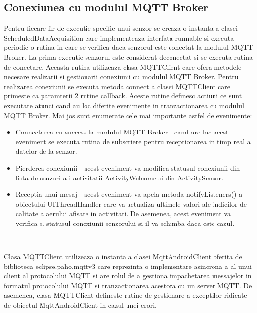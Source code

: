 \subsection{Conexiunea cu modulul MQTT Broker}\label{subsec:pi_appandroid_conectare_mqtt}
Pentru fiecare fir de executie specific unui senzor se creaza o instanta a clasei ScheduledDataAcquisition care implementeaza interfata runnable si executa periodic o rutina 
in care se verifica daca senzorul este conectat la modulul MQTT Broker. La prima executie senzorul este considerat deconectat si se executa rutina de conectare. 
Aceasta rutina utilizeaza clasa MQTTClient care ofera metodele necesare realizarii si gestionarii conexiunii cu modulul MQTT Broker. Pentru realizarea conexiunii se 
executa metoda connect a clasei MQTTClient care primeste ca paramterii 2 rutine callback. Aceste rutine definesc actiuni ce sunt executate atunci cand au loc 
diferite evenimente in tranzactionarea cu modulul MQTT Broker. Mai jos sunt enumerate cele mai importante astfel de evenimente:
\begin{itemize}
	\item Connectarea cu success la modulul MQTT Broker - cand are loc acest eveniment se executa rutina de subscriere pentru receptionarea in timp real a datelor de la 
	senzor.
	\item Pierderea conexiunii - acest eveniment va modifica statusul conexiunii din lista de senzori a-i activitatii ActivityWelcome si din ActivitySensor.
	\item Receptia unui mesaj - acest eveniment va apela metoda notifyListeners() a obiectului UIThreadHandler care va actualiza ultimele valori ale indicilor de 
    calitate a aerului afisate in activitati. De asemenea, acest eveniment va verifica si statusul conexiunii senzorului si il va schimba 
	daca este cazul.
\end{itemize}

\

Clasa MQTTClient utilizeaza o instanta a clasei MqttAndroidClient oferita de biblioteca eclipse.paho.mqttv3 care reprezinta o implementare asincrona a 
al unui client al protocolului MQTT si are rolul de a gestiona impachetarea messajelor in formatul protocolului MQTT si tranzactionarea acestora cu un server MQTT. De asemenea, 
clasa MQTTClient defineste rutine de gestionare a exceptilor ridicate de obiectul MqttAndroidClient in cazul unei erori. 

